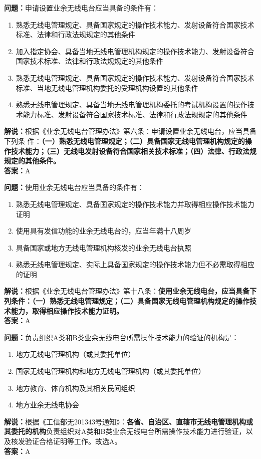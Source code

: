 \textbf{问题：}申请设置业余无线电台应当具备的条件有：
\begin{enumerate}[label=\Alph*), leftmargin=1cm]
	\item 熟悉无线电管理规定、具备国家规定的操作技术能力、发射设备符合国家技术标准、法律和行政法规规定的其他条件
	\item 加入指定协会、具备当地无线电管理机构规定的操作技术能力、发射设备符合国家技术标准、法律和行政法规规定的其他条件
	\item 熟悉无线电管理规定、具备国家规定的操作技术能力、发射设备符合国家技术标准、当地无线电管理机构委托的受理机构设置的其他条件
	\item 熟悉无线电管理规定、具备当地无线电管理机构委托的考试机构设置的操作技术能力标准、发射设备符合国家技术标准、法律和行政法规规定的其他条件
\end{enumerate}
\textbf{解说：}根据《业余无线电台管理办法》第六条：申请设置业余无线电台，应当具备下列条
件：\textbf{（一）熟悉无线电管理规定；（二）具备国家无线电管理机构规定的操作技术能力；（三）无线电发射设备符合国家相关技术标准；（四）法律、行政法规规定的其他条件。}\\\textbf{答案：}A

\textbf{问题：}使用业余无线电台应当具备的条件有：
\begin{enumerate}[label=\Alph*), leftmargin=1cm]
	\item 熟悉无线电管理规定、具备国家规定的操作技术能力并取得相应操作技术能力证明
	\item 使用具有发信功能的业余无线电台的，应当年满十八周岁
	\item 具备国家或地方无线电管理机构核发的业余无线电台执照
	\item 熟悉无线电管理规定、实际上具备国家规定的操作技术能力但不必需取得相应的证明
\end{enumerate}
\textbf{解说：}根据《业余无线电台管理办法》第十八条：\textbf{使用业余无线电台，应当具备下列条件：（一）熟悉无线电管理规定；（二）具备国家无线电管理机构规定的操作技术能力，取得相应操作技术能力证明。}\\\textbf{答案：}A

\textbf{问题：}负责组织A类和B类业余无线电台所需操作技术能力的验证的机构是：
\begin{enumerate}[label=\Alph*), leftmargin=1cm]
	\item 地方无线电管理机构（或其委托单位）
	\item 国家无线电管理机构和地方无线电管理机构（或其委托单位）
	\item 地方教育、体育机构及其相关民间组织
	\item 地方业余无线电协会
\end{enumerate}
\textbf{解说：}根据《工信部无201343号通知》：\textbf{各省、自治区、直辖市无线电管理机构或其委托的机构}负责组织对A类和B类业余无线电台所需操作技术能力进行验证，以及核发验证合格证明等工作。故选A。\\\textbf{答案：}A

